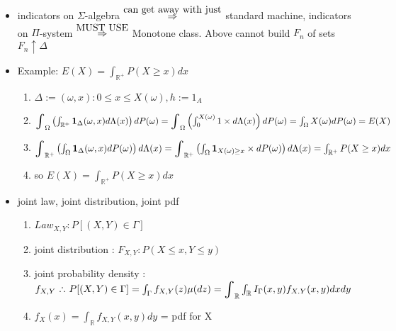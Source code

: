 \documentclass[10pt,landscape,a4paper]{article}
\let\displaystyle\textstyle
\newcommand\myright[1]{\stackrel{{\normalfont\mbox{#1}}}{ \Rightarrow }}
\def\scaleint#1{\vcenter{\hbox{\scaleto[3ex]{\displaystyle\int}{#1}}}}
\newcommand{\myint}{\scaleint{4ex}}
\begin{document}
\begin{multicols*}{3}
\begin{spacing}{0.5}
\begin{itemize}
\begin{enumerate}
\end{enumerate}

\item  indicators on $\Sigma$-algebra $ \myright{can get away with just}$ standard machine, indicators on $\Pi$-system $ \myright{MUST USE}$ Monotone class. Above cannot build ${F_n}$ of sets $F_n \uparrow \Delta$

\item \colorbox{green!10}{Example: } $E(X) = \int_{\mathbb{R}^+}    P(X \ge x)  dx $

\begin{enumerate}

\item $\Delta := {(\omega,x) : 0 \le x \le X(\omega)}, h := 1_A$

\item $\myint_{\Omega} \left( \int_{\mathbb{R}^+} \mathbf{1}_{\Delta}(\omega,x) d\Lambda(x) \right) dP(\omega) \\= \myint_{\Omega} \left( \int_{0}^{X(\omega)} 1 \times d\Lambda(x) \right) dP(\omega) \\= \int_{\Omega} X(\omega) dP(\omega) \\= E(X) $

\item $\myint_{\mathbb{R}^+} \left( \int_{\Omega} \mathbf{1}_{\Delta}(\omega,x) dP(\omega)  \right) d\Lambda(x) \\= \myint_{\mathbb{R}^+} \left( \int_{\Omega} \mathbf{1}_{X(\omega) \ge x} \times dP(\omega) \right) d\Lambda(x) \\= \int_{\mathbb{R}^+}    P(X \ge x)  dx $

\item so $E(X) = \int_{\mathbb{R}^+}    P(X \ge x)  dx $

\end{enumerate}

\item \colorbox{green!10}{joint law, joint distribution, joint pdf} 
\begin{enumerate}

\item $Law_{X,Y} : P[(X,Y) \in \Gamma]$
\item joint distribution : $F_{X,Y} : P(X \le x,Y \le y)$
\item joint probability density  : $f_{X,Y} \sucht P[(X,Y) \in \Gamma] = \int_{\Gamma} f_{X,Y}(z)\mu(dz) = \myint_{\mathbb{R}} \int_{\mathbb{R}} I_{\Gamma}(x,y)f_{X.Y}(x,y)dx dy$
\item $ f_X(x)= \int_{\mathbb{R}}f_{X,Y}(x,y)dy$ = pdf for X
\end{enumerate}


\end{itemize}
\end{spacing}
\end{multicols*}
\end{document}
